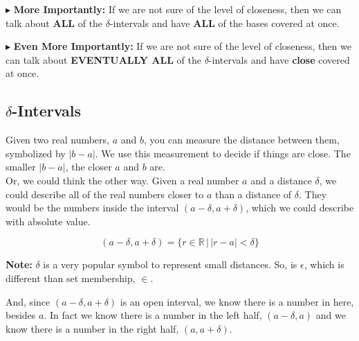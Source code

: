 \documentclass{ximera}
\begin{document}
\textbf{\textcolor{red!70!darkgray}{$\blacktriangleright$}} \textbf{\textcolor{purple!85!blue}{More Importantly:}} If we are not sure of the level of closeness, then we can talk about \textbf{\textcolor{red!70!black}{ALL}} of the $\delta$-intervals and have \textbf{\textcolor{red!70!black}{ALL}} of the bases covered at once.



\textbf{\textcolor{red!70!darkgray}{$\blacktriangleright$}} \textbf{\textcolor{purple!85!blue}{Even More Importantly:}} If we are not sure of the level of closeness, then we can talk about \textbf{\textcolor{red!70!black}{EVENTUALLY ALL}} of the $\delta$-intervals and have \textbf{\textcolor{red!70!black}{close}} covered at once.





















\subsection{$\delta$-Intervals}



Given two real numbers, $a$ and $b$, you can measure the distance between them, symbolized by $|b-a|$.  We use this measurement to decide if things are close.  The smaller $|b-a|$, the closer $a$ and $b$ are. \\



Or, we could think the other way.  Given a real number $a$ and a distance $\delta$, we could describe all of the real numbers closer to $a$ than a distance of $\delta$.  They would be the numbers inside the interval $(a-\delta, a+\delta)$, which we could describe with absolute value.

\[      (a-\delta, a+\delta) = \{ r \in \mathbb{R} \, | \, |r - a| < \delta        \}       \]


\textbf{Note:}  $\delta$ is a very popular symbol to represent small distances.  So, is $\epsilon$, which is different than set membership, $\in$.



And, since $(a-\delta, a+\delta)$ is an open interval, we know there is a number in here, besides $a$.  In fact we know there is a number in the left half, $(a-\delta, a)$ and we know there is a number in the right half, $(a, a+\delta)$.
\end{document}
